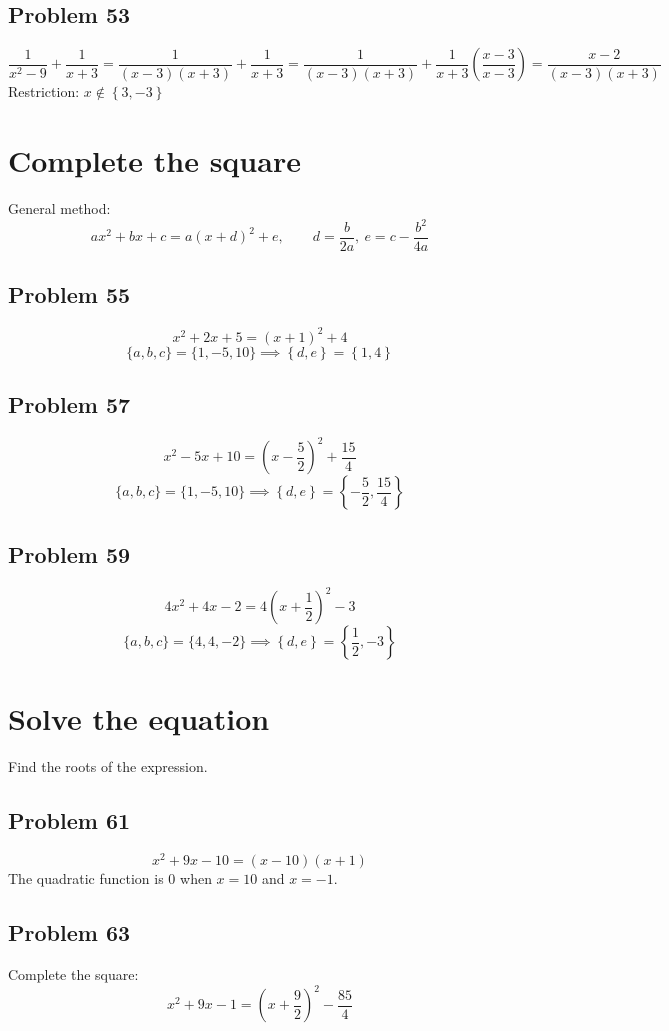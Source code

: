 \documentclass[11pt, oneside]{article}   	%
\begin{document}
\subsection{Problem 53}
$$\frac{1}{x^2-9}+\frac{1}{x+3}
=\frac{1}{(x-3) (x+3)}+\frac{1}{x+3}
=\frac{1}{(x-3) (x+3)}+\frac{1}{x+3} \left(\frac{x-3}{x-3}\right)
=\frac{x-2}{(x-3) (x+3)}$$
Restriction: $x\notin\left\{3,-3\right\}$


\section{Complete the square}
General method:
$$ax^2 + bx + c = a(x+d)^2 + e, \qquad d = \frac{b}{2a}, \ e = c - \frac{b^2}{4a}$$

\subsection{Problem 55}
$$x^2+2 x+5 = \left(x+1\right)^{2}+4$$
$$\{a,b,c\}=\{1,-5,10\} \implies \left\{d,e\right\} = \left\{1, 4\right\}$$

\subsection{Problem 57}
$$x^2 - 5 x + 10 = \left(x-\frac{5}{2}\right)^2+\frac{15}{4}$$
$$\{a,b,c\}=\{1,-5,10\} \implies \left\{d,e\right\} = \left\{-\frac{5}{2},\frac{15}{4}\right\}$$

\subsection{Problem 59}
$$4 x^2 + 4 x - 2 = 4 \left(x+\frac{1}{2}\right)^2-3$$
$$\{a,b,c\}=\{4, 4, -2\} \implies \left\{d,e\right\} = \left\{\frac{1}{2}, -3\right\}$$


\section{Solve the equation}
Find the roots of the expression.

\subsection{Problem 61}
$$x^2+9 x-10 = (x-10)(x+1)$$
The quadratic function is $0$ when $x=10$ and $x=-1$.

\subsection{Problem 63}
Complete the square:
$$x^2+9 x-1 = \left(x+\frac{9}{2}\right)^2 -\frac{85}{4}$$
\end{document}
